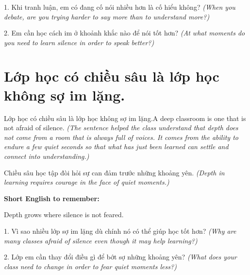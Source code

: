 \begin{tuhocnhanh}
1. Khi tranh luận, em có đang cố nói nhiều hơn là cố hiểu không? \textit{(When you debate, are you trying harder to say more than to understand more?)}

2. Em cần học cách im ở khoảnh khắc nào để nói tốt hơn? \textit{(At what moments do you need to learn silence in order to speak better?)}
\end{tuhocnhanh}
\ngancach


\section{Lớp học có chiều sâu là lớp học không sợ im lặng.}
\begin{truyen}{Lớp học có chiều sâu là lớp học không sợ im lặng.}{A deep classroom is one that is not afraid of silence.}
\textit{(The sentence helped the class understand that depth does not come from a room that is always full of voices. It comes from the ability to endure a few quiet seconds so that what has just been learned can settle and connect into understanding.)}
\end{truyen}

\begin{baihoc}
Chiều sâu học tập đòi hỏi sự can đảm trước những khoảng yên.
\textit{(Depth in learning requires courage in the face of quiet moments.)}
\end{baihoc}

\begin{ghinhoanh}
\textbf{Short English to remember:}

Depth grows where silence is not feared.

\end{ghinhoanh}

\begin{tuhocnhanh}
1. Vì sao nhiều lớp sợ im lặng dù chính nó có thể giúp học tốt hơn? \textit{(Why are many classes afraid of silence even though it may help learning?)}

2. Lớp em cần thay đổi điều gì để bớt sợ những khoảng yên? \textit{(What does your class need to change in order to fear quiet moments less?)}
\end{tuhocnhanh}
\ngancach


